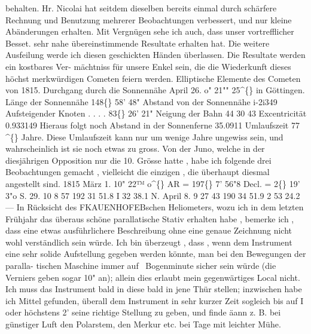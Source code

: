 \documentclass[12pt,a4paper]{article}
\newcommand{\degree}{\textdegree}
\begin{document}
\newpage
behalten.  Hr.  Nicolai  hat  seitdem  dieselben  bereits  einmal  durch  schärfere  Rechnung  und  Benutzung 
mehrerer  Beobachtungen  verbessert,  und  nur  kleine  Abänderungen  erhalten.  Mit  Vergnügen  sehe  ich 
auch,  dass  unser  vortrefflicher  Besset.  sehr  nahe  übereinstimmende  Resultate  erhalten  hat.  Die  weitere 
Ausfeilung  werde  ich  diesen  geschickten  Händen  überlassen.  Die  Resultate  werden  ein  kostbares  Ver- 
mächtniss  für  unsere  Enkel  sein,  die  die  Wiederkunft  dieses  höchst  merkwürdigen  Cometen  feiern  werden. 
Elliptische  Elemente  des  Cometen  von  1815. 
Durchgang  durch  die  Sonnennähe  April  26.  o"  21""  25\textasciicircum\{\}  in  Göttingen. 
Länge  der  Sonnennähe   
148\degree\{\}  58'    48" 
Abstand  von  der  Sonnennähe   
i-2i349 
Aufsteigender  Knoten      .     .     .     .   
83\degree\{\}  26'    21" 
Neigung  der  Bahn   
44     30     43 
Excentricität   
0.933149 
Hieraus  folgt  noch  Abstand  in  der  Sonnenferne  35.0911  Umlaufszeit  77 \textasciicircum\{\}  Jahre.  Diese  Umlaufszeit 
kann  nur  um  wenige  Jahre  ungewiss  sein,  und  wahrscheinlich  ist  sie  noch  etwas  zu  gross. 
Von  der  Juno,  welche  in  der  diesjährigen  Opposition  nur  die  10.  Grösse  hatte ,  habe  ich  folgende 
drei  Beobachtungen  gemacht ,  vielleicht  die  einzigen ,  die  überhaupt  diesmal  angestellt  sind. 
1815  März     1.     10"  22™    o\textasciicircum\{\}     AR  =  197\degree\{\}     7'    56"8     Decl.  =  2\degree\{\}  19'     3"o  S. 
29.     10      8     57  192     31     51.8  I     32     38.1  N. 
April    8.      9     27     43  190     34     51.9  2     53     24.2  --- 
In  Rücksicht  des  FKAUENHOFEBschen  Heliometers,  wozu  ich  in  dem  letzten  Frühjahr  das  überaus 
schöne  parallatische  Stativ  erhalten  habe ,  bemerke  ich ,  dass  eine  etwas  ausführlichere  Beschreibung 
ohne  eine  genaue  Zeichnung  nicht  wohl  verständlich  sein  würde.  Ich  bin  überzeugt ,  dass ,  wenn  dem 
Instrument  eine  sehr  solide  Aufstellung  gegeben  werden  könnte,  man  bei  den  Bewegungen  der  paralla- 
tischen  Maschine  immer  auf  \  Bogenminute  sicher  sein  würde  (die  Verniers  geben  sogar  10"  an);  allein 
dies  erlaubt  mein  gegenwärtiges  Local  nicht.  Ich  muss  das  Instrument  bald  in  diese  bald  in  jene  Thür 
stellen;  inzwischen  habe  ich  Mittel  gefunden,  überall  dem  Instrument  in  sehr  kurzer  Zeit  sogleich  bis 
auf  I  oder  höchstens  2'  seine  richtige  Stellung  zu  geben,  und  finde  äann  z.  B.  bei  günstiger  Luft  den 
Polarstem,  den  Merkur  etc.  bei  Tage  mit  leichter  Mühe. 
\end{document}
